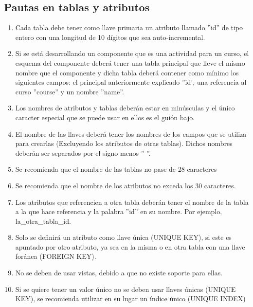 \subsection{Pautas en tablas y atributos}
    \begin{enumerate}
        \item Cada tabla debe tener como llave primaria un atributo llamado ''id'' de tipo entero con una longitud de 10 dígitos que sea auto-incremental. 
        \item Si se está desarrollando un componente que es una actividad para un curso, el esquema del componente deberá tener una tabla principal que lleve el mismo nombre que el componente y dicha tabla deberá contener como mínimo los siguientes campos: el principal anteriormente explicado ''id', una referencia al curso ''course'' y un nombre ''name''. 
        \item Los nombres de atributos y tablas deberán estar en minúsculas y el único caracter especial que se puede usar en ellos es el guión bajo.
        \item El nombre de las llaves deberá tener los nombres de los campos que se utiliza para crearlas (Excluyendo los atributos de otras tablas). Dichos nombres deberán ser separados por el signo menos ''-''.
        \item Se recomienda que el nombre de las tablas no pase de 28 caracteres
        \item Se recomienda que el nombre de los atributos no exceda los 30 caracteres.
        \item Los atributos que referencien a otra tabla deberán tener el nombre de la tabla a la que hace referencia y la palabra ''id'' en su nombre. Por ejemplo, la\_otra\_tabla\_id.
        \item Solo se definirá un atributo como llave única (UNIQUE KEY), si este es apuntado por otro atributo, ya sea en la misma o en otra tabla con una llave foránea (FOREIGN KEY).
        \item No se deben de usar vistas, debido a que no existe soporte para ellas.
        \item Si se quiere tener un valor único no se deben usar llaves únicas (UNIQUE KEY), se recomienda utilizar en su lugar un índice único (UNIQUE INDEX)
    \end{enumerate}
     
